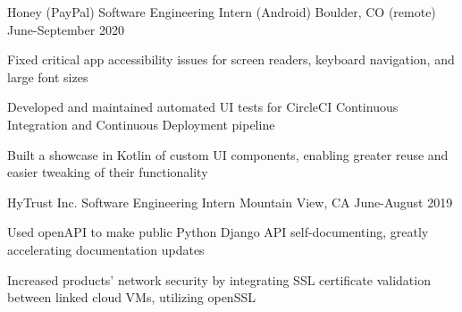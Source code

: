 \documentclass[12pt, a4paper]{awesome-cv}
\begin{document}
\makecvheader


\begin{cventries}

  \cventry
    {Honey (PayPal)}
    {Software Engineering Intern (Android)}
    {Boulder, CO (remote)}
    {June-September 2020}
    {
        \begin{cvitems}
            \item {Fixed critical app accessibility issues for screen readers, keyboard navigation, and large font sizes}
            \item {Developed and maintained automated UI tests for CircleCI Continuous Integration and Continuous Deployment pipeline}
            \item {Built a showcase in Kotlin of custom UI components, enabling greater reuse and easier tweaking of their functionality}
        \end{cvitems}
    }

  \cventry
    {HyTrust Inc.}
    {Software Engineering Intern}
    {Mountain View, CA}
    {June-August 2019}
    {
      \begin{cvitems}
      	\item {Used openAPI to make public Python Django API self-documenting, greatly accelerating documentation updates}
	      \item {Increased products' network security by integrating SSL certificate validation between linked cloud VMs, utilizing openSSL}
      \end{cvitems}
    }




\end{cventries}
\end{document}

